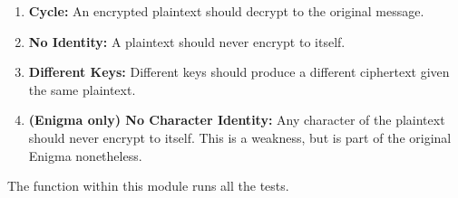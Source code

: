 \documentclass{article}
\begin{document}
\begin{enumerate}
\item \textbf{Cycle:} An encrypted plaintext should decrypt
  to the original message.
\item \textbf{No Identity:} A plaintext should never encrypt to itself.
\item \textbf{Different Keys:} Different keys should produce a
  different ciphertext given the same plaintext.
\item \textbf{(Enigma only) No Character Identity:} Any character of
  the plaintext should never encrypt to itself. This is a weakness, but is
  part of the original Enigma nonetheless.
\end{enumerate}

The function  within this module runs all the tests.
\end{document}
